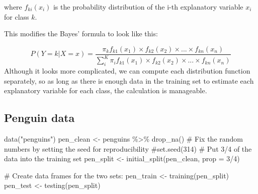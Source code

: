 \documentclass[
  letterpaper,
  DIV=11,
  numbers=noendperiod]{scrreprt}
\newenvironment{Shaded}{\begin{snugshade}}{\end{snugshade}}
\newcommand{\AttributeTok}[1]{\textcolor[rgb]{0.40,0.45,0.13}{#1}}
\newcommand{\CommentTok}[1]{\textcolor[rgb]{0.37,0.37,0.37}{#1}}
\newcommand{\DecValTok}[1]{\textcolor[rgb]{0.68,0.00,0.00}{#1}}
\newcommand{\FunctionTok}[1]{\textcolor[rgb]{0.28,0.35,0.67}{#1}}
\newcommand{\NormalTok}[1]{\textcolor[rgb]{0.00,0.23,0.31}{#1}}
\newcommand{\OtherTok}[1]{\textcolor[rgb]{0.00,0.23,0.31}{#1}}
\newcommand{\SpecialCharTok}[1]{\textcolor[rgb]{0.37,0.37,0.37}{#1}}
\newcommand{\StringTok}[1]{\textcolor[rgb]{0.13,0.47,0.30}{#1}}
\begin{document}
where \(f_{ki}(x_i)\) is the probability distribution of the i-th
explanatory variable \(x_i\) for class \(k\).

This modifies the Bayes' formula to look like this:

\[
P(Y = k | X = x) = \frac{\pi_k f_{k1} (x_1) \times f_{k2} (x_2) \times ... \times f_{kn} (x_n)}{\sum_i^K \pi_i f_{k1} (x_1) \times f_{k2} (x_2) \times ... \times f_{kn} (x_n)}
\] Although it looks more complicated, we can compute each distribution
function separately, so as long as there is enough data in the training
set to estimate each explanatory variable for each class, the
calculation is manageable.

\hypertarget{penguin-data}{%
\subsection{Penguin data}\label{penguin-data}}

\begin{Shaded}
\begin{Highlighting}[]
\FunctionTok{data}\NormalTok{(}\StringTok{"penguins"}\NormalTok{)}
\NormalTok{pen\_clean }\OtherTok{\textless{}{-}}\NormalTok{ penguins }\SpecialCharTok{\%\textgreater{}\%} \FunctionTok{drop\_na}\NormalTok{()}
\CommentTok{\# Fix the random numbers by setting the seed  for reproducibility}
\CommentTok{\#set.seed(314)}
\CommentTok{\# Put 3/4 of the data into the training set }
\NormalTok{pen\_split }\OtherTok{\textless{}{-}} \FunctionTok{initial\_split}\NormalTok{(pen\_clean, }\AttributeTok{prop =} \DecValTok{3}\SpecialCharTok{/}\DecValTok{4}\NormalTok{)}

\CommentTok{\# Create data frames for the two sets:}
\NormalTok{pen\_train }\OtherTok{\textless{}{-}} \FunctionTok{training}\NormalTok{(pen\_split)}
\NormalTok{pen\_test  }\OtherTok{\textless{}{-}} \FunctionTok{testing}\NormalTok{(pen\_split)}
\end{Highlighting}
\end{Shaded}
\end{document}
